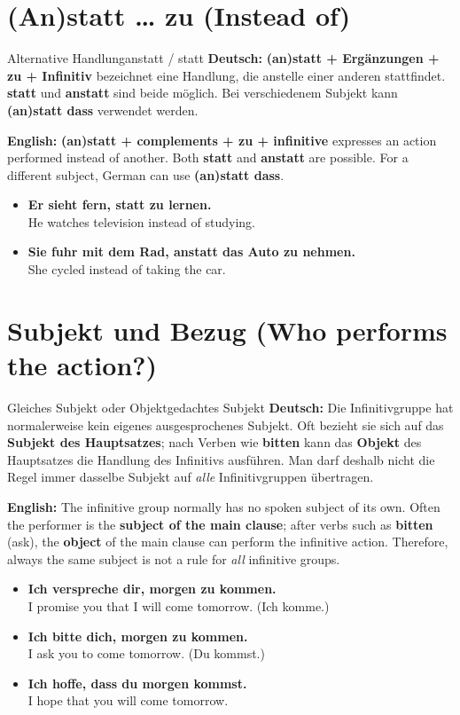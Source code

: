 \documentclass[a4paper,11pt]{article}
\newcommand{\GermanText}[1]{\textbf{Deutsch: }#1\par}
\newcommand{\EnglishText}[1]{{\small\color{SoftGray}\textbf{English: }#1\par}}
\newcommand{\ExampleItem}[2]{\item \textbf{#1}\\{\small\color{SoftGray}#2}}
\begin{document}
\section{(An)statt \ldots{} zu \textnormal{(Instead of)}}
\begin{grammarentry}{Alternative Handlung}{anstatt / statt}
\GermanText{\textbf{(an)statt + Ergänzungen + zu + Infinitiv} bezeichnet eine Handlung, die anstelle einer anderen stattfindet. \textbf{statt} und \textbf{anstatt} sind beide möglich. Bei verschiedenem Subjekt kann \textbf{(an)statt dass} verwendet werden.}
\EnglishText{\textbf{(an)statt + complements + zu + infinitive} expresses an action performed instead of another. Both \textbf{statt} and \textbf{anstatt} are possible. For a different subject, German can use \textbf{(an)statt dass}.}
\end{grammarentry}
\begin{exbox}\begin{itemize}
\ExampleItem{Er sieht fern, statt zu lernen.}{He watches television instead of studying.}
\ExampleItem{Sie fuhr mit dem Rad, anstatt das Auto zu nehmen.}{She cycled instead of taking the car.}
\end{itemize}\end{exbox}

\section{Subjekt und Bezug \textnormal{(Who performs the action?)}}
\begin{grammarentry}{Gleiches Subjekt oder Objekt}{gedachtes Subjekt}
\GermanText{Die Infinitivgruppe hat normalerweise kein eigenes ausgesprochenes Subjekt. Oft bezieht sie sich auf das \textbf{Subjekt des Hauptsatzes}; nach Verben wie \textbf{bitten} kann das \textbf{Objekt} des Hauptsatzes die Handlung des Infinitivs ausführen. Man darf deshalb nicht die Regel \glqq immer dasselbe Subjekt\grqq{} auf \emph{alle} Infinitivgruppen übertragen.}
\EnglishText{The infinitive group normally has no spoken subject of its own. Often the performer is the \textbf{subject of the main clause}; after verbs such as \textbf{bitten} (ask), the \textbf{object} of the main clause can perform the infinitive action. Therefore, \glqq always the same subject\grqq{} is not a rule for \emph{all} infinitive groups.}
\end{grammarentry}
\begin{exbox}\begin{itemize}
\ExampleItem{Ich verspreche dir, morgen zu kommen.}{I promise you that I will come tomorrow. (Ich komme.)}
\ExampleItem{Ich bitte dich, morgen zu kommen.}{I ask you to come tomorrow. (Du kommst.)}
\ExampleItem{Ich hoffe, dass du morgen kommst.}{I hope that you will come tomorrow.}
\end{itemize}\end{exbox}
\end{document}
